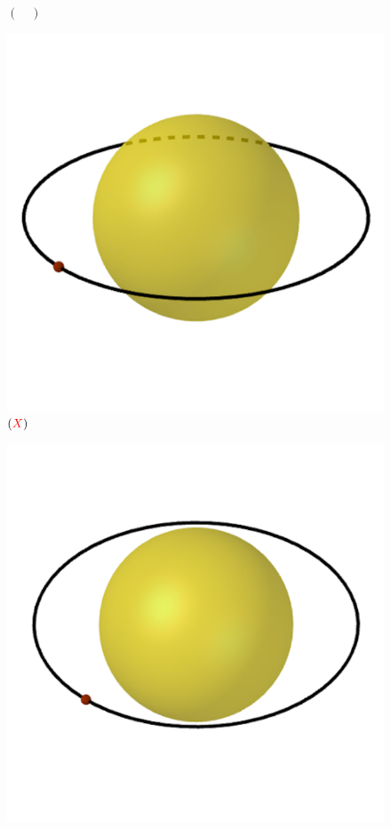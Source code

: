 \documentclass[a4paper, 12pt]{article}
\newcommand{\red}[1]{\textcolor{red}{#1}}
\begin{document}
\begin{flushleft}
\begin{itemize}
\begin{itemize}
\begin{multicols}{3}
\begin{figure}[H]
							\captionsetup{labelformat=empty}
							\caption{$(\quad)$}
						\end{figure}
						\begin{figure}[H]
							\centering
							\includegraphics[scale=0.2]{./img/5b3.png}
							\captionsetup{labelformat=empty}
							\caption{$(\red{X})$}
						\end{figure}
						\begin{figure}[H]
							\centering
							\includegraphics[scale=0.2]{./img/5b4.png}

\end{figure}
\end{multicols}
\end{itemize}
\end{itemize}
\end{flushleft}
\end{document}

